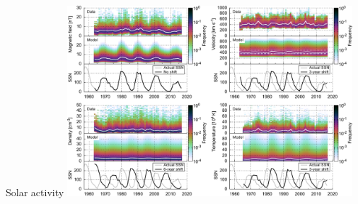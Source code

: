 \begin{frame}[c]{Solar activity}{}
	\centering
	\includegraphics[width=0.8\textwidth]{../figures_paper/OMNI_yearly_BVdblNTSSN_fit_e_plot.pdf}
\end{frame}
